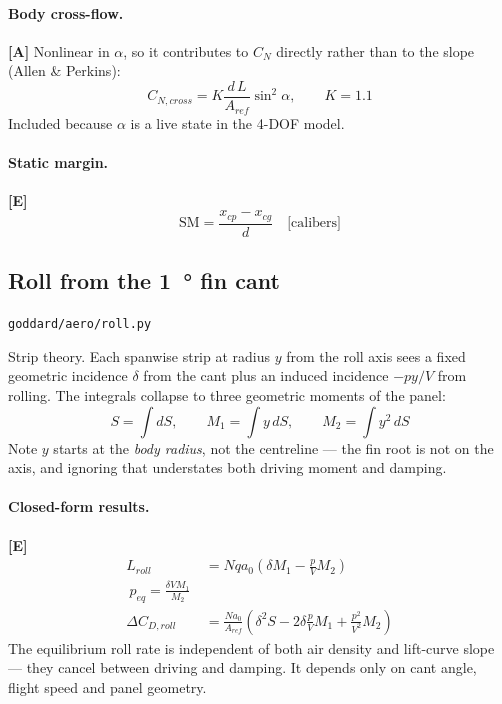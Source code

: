 \documentclass[11pt,a4paper]{article}
\newcommand{\established}{\textcolor{okgreen}{\textbf{[E]}}\xspace}
\newcommand{\approxi}{\textcolor{amber}{\textbf{[A]}}\xspace}
\newcommand{\src}[1]{\hfill{\footnotesize\texttt{#1}}}
\begin{document}
\paragraph{Body cross-flow.} \approxi
Nonlinear in $\alpha$, so it contributes to $C_N$ directly rather than to the
slope (Allen \& Perkins):
\begin{equation}
C_{N,cross} = K \frac{d\,L}{A_{ref}} \sin^2\alpha, \qquad K = 1.1
\end{equation}
Included because $\alpha$ is a live state in the 4-DOF model.

\paragraph{Static margin.} \established
\begin{equation}
\text{SM} = \frac{x_{cp} - x_{cg}}{d} \quad \text{[calibers]}
\end{equation}

\subsection{Roll from the \SI{1}{\degree} fin cant}
\src{goddard/aero/roll.py}

Strip theory. Each spanwise strip at radius $y$ from the roll axis sees a fixed
geometric incidence $\delta$ from the cant plus an induced incidence
$-py/V$ from rolling. The integrals collapse to three geometric moments of the
panel:
\begin{equation}
S = \int dS, \qquad
M_1 = \int y\,dS, \qquad
M_2 = \int y^2\,dS
\end{equation}
Note $y$ starts at the \emph{body radius}, not the centreline --- the fin root
is not on the axis, and ignoring that understates both driving moment and
damping.

\paragraph{Closed-form results.} \established
\begin{align}
L_{roll} &= N q a_0 \left(\delta M_1 - \frac{p}{V} M_2\right) \\
\boxed{\ p_{eq} = \frac{\delta V M_1}{M_2}\ } & \\
\Delta C_{D,roll} &= \frac{N a_0}{A_{ref}}
  \left(\delta^2 S - 2\delta\frac{p}{V}M_1 + \frac{p^2}{V^2}M_2\right)
\end{align}
The equilibrium roll rate is independent of both air density and lift-curve
slope --- they cancel between driving and damping. It depends only on cant
angle, flight speed and panel geometry.
\end{document}
